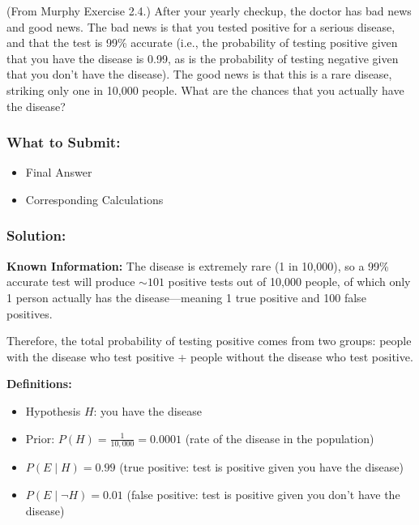\documentclass{article}
\begin{document}
\begin{aprob}
     (From Murphy Exercise 2.4.) 
    After your yearly checkup, the doctor has bad news and good news. 
    The bad news is that you tested positive for a serious disease, and that the test is 99\% accurate (i.e., the probability of testing positive given that you have the disease is 0.99, as is the probability of testing negative given that you don't have the disease).
    The good news is that this is a rare disease, striking only one in 10,000 people.
    What are the chances that you actually have the disease?
    
    \subsubsection*{What to Submit:}
    \begin{itemize}
        \item Final Answer
        \item Corresponding Calculations
    \end{itemize}

    \subsubsection*{Solution:}

    \textbf{Known Information:}
    The disease is extremely rare (1 in 10,000), so a 99\% accurate test will produce ${\sim}101$ positive tests out of 10,000 people, of which only 1 person actually has the disease---meaning 1 true positive and 100 false positives.

    Therefore, the total probability of testing positive comes from two groups: people with the disease who test positive + people without the disease who test positive.

    \medskip
    \textbf{Definitions:}
    \begin{itemize}
        \item Hypothesis $H$: you have the disease
        \item Prior: $P(H) = \frac{1}{10{,}000} = 0.0001$ \quad (rate of the disease in the population)
        \item $P(E \mid H) = 0.99$ \quad (true positive: test is positive given you have the disease)
        \item $P(E \mid \neg H) = 0.01$ \quad (false positive: test is positive given you don't have the disease)
    \end{itemize}


\end{aprob}
\end{document}

